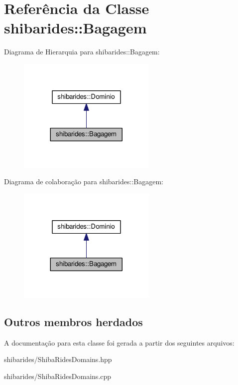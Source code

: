 \hypertarget{classshibarides_1_1Bagagem}{}\section{Referência da Classe shibarides\+:\+:Bagagem}
\label{classshibarides_1_1Bagagem}


Diagrama de Hierarquia para shibarides\+:\+:Bagagem\+:\nopagebreak
\begin{figure}[H]
\begin{center}
\leavevmode
\includegraphics[width=188pt]{classshibarides_1_1Bagagem__inherit__graph}
\end{center}
\end{figure}


Diagrama de colaboração para shibarides\+:\+:Bagagem\+:\nopagebreak
\begin{figure}[H]
\begin{center}
\leavevmode
\includegraphics[width=188pt]{classshibarides_1_1Bagagem__coll__graph}
\end{center}
\end{figure}
\subsection*{Outros membros herdados}


A documentação para esta classe foi gerada a partir dos seguintes arquivos\+:\begin{DoxyCompactItemize}
\item 
shibarides/Shiba\+Rides\+Domains.\+hpp\item 
shibarides/Shiba\+Rides\+Domains.\+cpp\end{DoxyCompactItemize}
